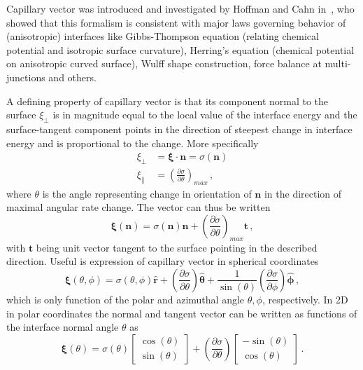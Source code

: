 Capillary vector was introduced and investigated by Hoffman and Cahn in~\cite{Hoffman1972,Cahn1974}, who showed that this formalism is consistent with major laws governing behavior of (anisotropic) interfaces like Gibbs-Thompson equation (relating chemical potential and isotropic surface curvature), Herring's equation (chemical potential on anisotropic curved surface), Wulff shape construction, force balance at multi-junctions and others. 

A defining property of capillary vector is that its component normal to the surface $\xi_\perp$ is in magnitude equal to the local value of the interface energy and the surface-tangent component points in the direction of steepest change in interface energy and is proportional to the change. More specifically  
\begin{align}
    \xi_\perp &= \bm{\xi}\cdot\bm{n}=\sigma(\bm{n}) \\
    \xi_\| &= \left(\frac{\partial \sigma}{\partial \theta}\right)_{max} \,,
\end{align}
where $\theta$ is the angle representing change in orientation of $\bm{n}$ in the direction of maximal angular rate change. The vector can thus be written
\begin{equation}
    \bm{\xi}(\bm{n}) = \sigma(\bm{n})\bm{n} + \left(\frac{\partial \sigma}{\partial \theta}\right)_{max} \bm{t} \,,
\end{equation}
with $\bm{t}$ being unit vector tangent to the surface pointing in the described direction. Useful is expression of capillary vector in spherical coordinates 
\begin{equation}
    \bm{\xi}(\theta,\phi) = \sigma(\theta,\phi)\bm{\hat{r}} + \left(\frac{\partial \sigma}{\partial \theta}\right)\bm{\hat{\theta}} + \frac{1}{\sin(\theta)}\left(\frac{\partial \sigma}{\partial \phi}\right)\bm{\hat{\phi}} \,,
\end{equation}
which is only function of the polar and azimuthal angle $\theta,\phi$, respectively. In 2D in polar coordinates the normal and tangent vector can be written as functions of the interface normal angle $\theta$ as
\begin{equation} \label{eq_xivec_2D}
    \bm{\xi}(\theta) = \sigma(\theta)\begin{bmatrix}
          \cos(\theta)  \\
          \sin(\theta) 
     \end{bmatrix} + \left(\frac{\partial \sigma}{\partial \theta}\right)\begin{bmatrix}
          -\sin(\theta) \\
          \cos(\theta)  
     \end{bmatrix} \,.
\end{equation}

